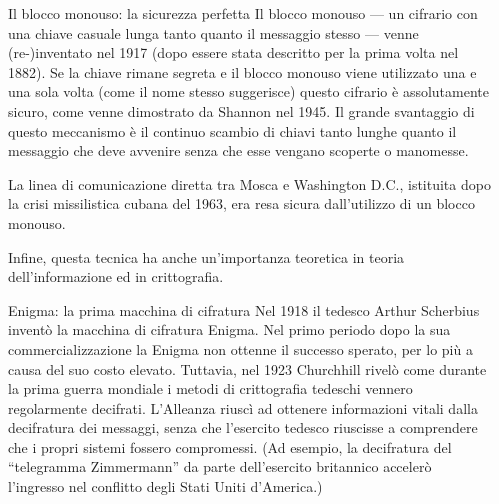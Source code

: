 \documentclass[final,hyperref={pdfpagelabels=false}]{beamer}
\begin{document}
\begin{frame}{}
\begin{columns}[t]
\begin{column}{.3\linewidth}
    \end{column}
    \begin{column}{.3\linewidth}
        \begin{block}{Il blocco monouso: la sicurezza perfetta}
          Il blocco monouso --- un cifrario con una chiave casuale lunga tanto quanto il messaggio stesso --- venne (re-)inventato nel 1917 (dopo essere stata descritto per la prima volta nel 1882). Se la chiave rimane segreta e il blocco monouso viene utilizzato una e una sola volta (come il nome stesso suggerisce) questo cifrario è assolutamente sicuro, come venne dimostrato da Shannon nel 1945. Il grande svantaggio di questo meccanismo è il continuo scambio di chiavi tanto lunghe quanto il messaggio che deve avvenire senza che esse vengano scoperte o manomesse. \par
          La linea di comunicazione diretta tra Mosca e Washington D.C., istituita dopo la crisi missilistica cubana del 1963, era resa sicura dall'utilizzo di un blocco monouso. \par
          Infine, questa tecnica ha anche un'importanza teoretica in teoria dell'informazione ed in crittografia.
        \end{block}
        \begin{block}{Enigma: la prima macchina di cifratura}
          Nel 1918 il tedesco Arthur Scherbius inventò la macchina di cifratura Enigma. Nel primo periodo dopo la sua commercializzazione la Enigma non ottenne il successo sperato, per lo più a causa del suo costo elevato. Tuttavia, nel 1923 Churchhill rivelò come durante la prima guerra mondiale i metodi di crittografia tedeschi vennero regolarmente decifrati. L'Alleanza riuscì ad ottenere informazioni vitali dalla decifratura dei messaggi, senza che l'esercito tedesco riuscisse a comprendere che i propri sistemi fossero compromessi. (Ad esempio, la decifratura del ``telegramma Zimmermann'' da parte dell'esercito britannico accelerò l'ingresso nel conflitto degli Stati Uniti d'America.) \par

\end{block}
\end{column}
\end{columns}
\end{frame}
\end{document}
